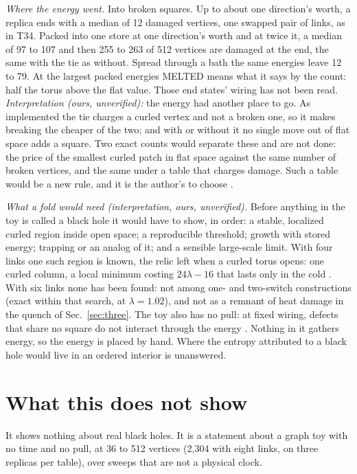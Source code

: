 \documentclass[aps,pre,10pt,twocolumn,superscriptaddress,nofootinbib]{revtex4-2}
\begin{document}
\emph{Where the energy went.} Into broken squares. Up to about one direction's worth, a replica ends with a median of
12 damaged vertices, one swapped pair of links, as in T34. Packed into one store at one direction's worth and at
twice it, a median of 97 to 107 and then 255 to 263 of 512 vertices are damaged at the end, the same with the tie as
without. Spread through a bath the same energies leave 12 to 79. At the largest packed energies MELTED means what it
says by the count: half the torus above the flat value. Those end states' wiring has not been read.
\emph{Interpretation (ours, unverified):} the energy had another place to go. As implemented the tie charges a curled
vertex and not a broken one, so it makes breaking the cheaper of the two; and with or without it no single move out
of flat space adds a square. Two exact counts would separate these and are not done: the price of the smallest curled
patch in flat space against the same number of broken vertices, and the same under a table that charges damage. Such
a table would be a new rule, and it is the author's to choose \cite{repo}.

\emph{What a fold would need (interpretation, ours, unverified).} Before anything in the toy is called a black hole
it would have to show, in order: a stable, localized curled region inside open space; a reproducible threshold;
growth with stored energy; trapping or an analog of it; and a sensible large-scale limit. With four links one such
region is known, the relic left when a curled torus opens: one curled column, a local minimum costing $24\lambda -
16$ that lasts only in the cold \cite{paper2}. With six links none has been found: not among one- and two-switch
constructions (exact within that search, at $\lambda = 1.02$), and not as a remnant of heat damage in the quench of
Sec.~\ref{sec:three}. The toy also has no pull: at fixed wiring, defects that share no square do not interact
through the energy \cite{paper11}. Nothing in it gathers energy, so the energy is placed by hand. Where the entropy
attributed to a black hole would live in an ordered interior is unanswered.

\section{What this does not show}

It shows nothing about real black holes. It is a statement about a graph toy with no time and no pull, at 36 to 512
vertices (2,304 with eight links, on three replicas per table), over sweeps that are not a physical clock.
\end{document}
